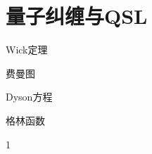 \ifx\allfiles\undefined



	\else
	\fi
	
\chapter{量子纠缠与QSL}
\begin{introduction}
	\item Wick定理
	\item 费曼图
	\item Dyson方程
	\item 格林函数
\end{introduction}
1
	
	
	
	
\ifx\allfiles\undefined

	\else
	\fi
